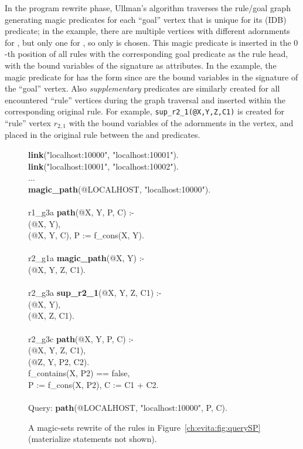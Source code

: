 In the program rewrite phase, Ullman's algorithm traverses the rule/goal
graph generating magic predicates for each ``goal'' vertex that is
unique for its (IDB) predicate; in the example, there are multiple vertices
with different adornments for , but only one for ,
so only  is chosen.  This magic predicate is inserted in
the $0$-th position of all rules with the corresponding goal predicate
as the rule head, with the bound variables of the signature as
attributes. In the example, the magic predicate for  has the
form  since  are the bound 
variables in the signature of the ``goal'' vertex.  Also
\emph{supplementary} predicates are similarly created for all
encountered ``rule'' vertices during the graph traversal and inserted
within the corresponding original rule.  For example, {\tt sup\_r2\_1(@X,Y,Z,C1)} 
is created for ``rule'' vertex $r_{2,1}$ with the bound variables of
the adornments in the vertex, and placed in the original rule 
between the  and  predicates.


\begin{figure}[!t]
\ssp
\begin{boxedminipage}{\linewidth}
{\bf link}("localhost:10000", "localhost:10001").\\
{\bf link}("localhost:10001", "localhost:10002").\\
...\\
{\bf magic\_path}(@LOCALHOST, "localhost:10000"). \\
\\
r1\_g3a {\bf path}(@X, Y, P, C) :- \\
(@X, Y), \\
(@X, Y, C), P := f\_cons(X, Y).\\
\\
r2\_g1a {\bf magic\_path}(@X, Y) :- \\
(@X, Y, Z, C1). \\
\\
r2\_g3a {\bf sup\_r2\_1}(@X, Y, Z, C1) :- \\
(@X, Y), \\
(@X, Z, C1). \\
\\
r2\_g3c {\bf path}(@X, Y, P, C) :- \\
(@X, Y, Z, C1), \\
(@Z, Y, P2, C2). \\
\datalogspace f\_contains(X, P2) == false, \\
\datalogspace P := f\_cons(X, P2), C := C1 + C2. \\
\\
Query: {\bf path}(@LOCALHOST, "localhost:10000", P, C).
\end{boxedminipage}
\caption{\label{ch:evita:fig:magicSP}A magic-sets rewrite of
      the rules in Figure~\ref{ch:evita:fig:querySP} (materialize statements not shown).}
\end{figure}

